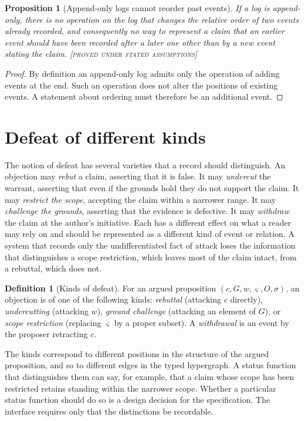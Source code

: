 \documentclass[11pt,twoside,openright]{book}
\theoremstyle{plain}
\newtheorem{proposition}[theorem]{Proposition}
\theoremstyle{definition}
\newtheorem{definition}[theorem]{Definition}
\theoremstyle{remark}
\newcommand{\Proved}{\textup{\textsc{[proved under stated assumptions]}}}
\begin{document}
\begin{proposition}[Append-only logs cannot reorder past events]\label{prop:noreorder}
If a log is append-only, there is no operation on the log that changes the relative order of two events already recorded, and consequently no way to represent a claim that an earlier event \emph{should have been} recorded after a later one other than by a new event stating the claim.
\Proved{}
\end{proposition}

\begin{proof}
By definition an append-only log admits only the operation of adding events at the end. Such an operation does not alter the positions of existing events. A statement about ordering must therefore be an additional event.
\end{proof}

\section{Defeat of different kinds}

The notion of defeat has several varieties that a record should distinguish. An objection may \emph{rebut} a claim, asserting that it is false. It may \emph{undercut} the warrant, asserting that even if the grounds hold they do not support the claim. It may \emph{restrict the scope}, accepting the claim within a narrower range. It may \emph{challenge the grounds}, asserting that the evidence is defective. It may \emph{withdraw} the claim at the author's initiative. Each has a different effect on what a reader may rely on and should be represented as a different kind of event or relation. A system that records only the undifferentiated fact of attack loses the information that distinguishes a scope restriction, which leaves most of the claim intact, from a rebuttal, which does not.

\begin{definition}[Kinds of defeat]\label{def:defeat}
For an argued proposition $(c,G,w,\varsigma,O,\sigma)$, an objection is of one of the following kinds: \emph{rebuttal} (attacking $c$ directly), \emph{undercutting} (attacking $w$), \emph{ground challenge} (attacking an element of $G$), or \emph{scope restriction} (replacing $\varsigma$ by a proper subset). A \emph{withdrawal} is an event by the proposer retracting $c$.
\end{definition}

The kinds correspond to different positions in the structure of the argued proposition, and so to different edges in the typed hypergraph. A status function that distinguishes them can say, for example, that a claim whose scope has been restricted retains standing within the narrower scope. Whether a particular status function should do so is a design decision for the specification. The interface requires only that the distinctions be recordable.
\end{document}
